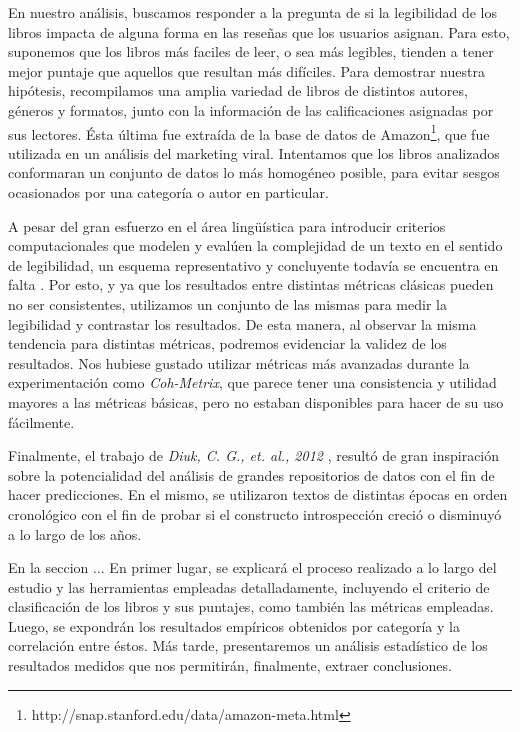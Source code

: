 \documentclass[12pt,journal,compsoc]{IEEEtran}
\begin{document}
En nuestro análisis, buscamos responder a la pregunta de si la legibilidad de los libros impacta de alguna forma en las reseñas que los usuarios asignan. Para esto, suponemos que los libros más faciles de leer, o sea más legibles, tienden a tener mejor puntaje que aquellos que resultan más difíciles. Para demostrar nuestra hipótesis, recompilamos una amplia variedad de libros de distintos autores, géneros y formatos, junto con la información de las calificaciones asignadas por sus lectores. Ésta última fue extraída de la base de datos de Amazon\footnote{http://snap.stanford.edu/data/amazon-meta.html}, que fue utilizada en un análisis del marketing viral\cite{leskovec}. Intentamos que los libros analizados conformaran un conjunto de datos lo más homogéneo posible, para evitar sesgos ocasionados por una categoría o autor en particular.

A pesar del gran esfuerzo en el área lingüística para introducir criterios computacionales que modelen y evalúen la complejidad de un texto en el sentido de legibilidad, un esquema representativo y concluyente todavía se encuentra en falta \cite{orlow, klare, kanungo, karmakar}. Por esto, y ya que los resultados entre distintas métricas clásicas pueden no ser consistentes\cite{izgi}, utilizamos un conjunto de las mismas para medir la legibilidad y contrastar los resultados. De esta manera, al observar la misma tendencia para distintas métricas, podremos evidenciar la validez de los resultados. Nos hubiese gustado utilizar métricas más avanzadas durante la experimentación como \textit{Coh-Metrix}\cite{graesser}, que parece tener una consistencia y utilidad mayores a las métricas básicas\cite{crossley}, pero no estaban disponibles para hacer de su uso fácilmente.

Finalmente, el trabajo de \textit{Diuk, C. G., et. al., 2012} \cite{diuk}, resultó de gran inspiración sobre la potencialidad del análisis de grandes repositorios de datos con el fin de hacer predicciones. En el mismo, se utilizaron textos de distintas épocas en orden cronológico con el fin de probar si el constructo introspección creció o disminuyó a lo largo de los años.

En la seccion ... %
En primer lugar, se explicará el proceso realizado a lo largo del estudio y las herramientas empleadas detalladamente, incluyendo el criterio de clasificación de los libros y sus puntajes, como también las métricas empleadas. Luego, se expondrán los resultados empíricos obtenidos por categoría y la correlación entre éstos. Más tarde, presentaremos un análisis estadístico de los resultados medidos que nos permitirán, finalmente, extraer conclusiones.
\end{document}
